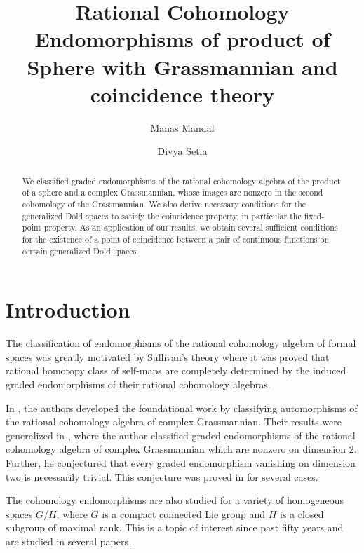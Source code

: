 \documentclass{amsart}
\title[Graded Endomorphisms of $H^*(\mathbb{S}^m \times \mathbb{C}G_{n,k};\mathbb Q)$]{%
Rational Cohomology Endomorphisms of product of Sphere with Grassmannian and coincidence theory%
}
\author[M. Mandal]{Manas Mandal}
\author[D. Setia]{Divya Setia}
\begin{document}
	\begin{abstract}
		We classified graded endomorphisms of the rational cohomology algebra of the product of a sphere and a complex Grassmannian, whose images are nonzero  in the second cohomology of the Grassmannian.
		We also derive necessary conditions for the generalized Dold spaces to satisfy the coincidence property, in particular the fixed-point property. As an application of our results, we obtain several sufficient conditions for the existence of a point of coincidence between a pair of continuous functions on certain generalized Dold spaces. 
	\end{abstract}
	
	\maketitle
	
	\section{Introduction} \label{intro}
	The classification of endomorphisms of the rational cohomology algebra of formal spaces was greatly motivated by Sullivan's theory where it was  proved that rational %
homotopy class of %
self-maps are completely determined by the induced graded endomorphisms of their rational cohomology algebras. 
	
	In \cite{brewster}, the authors developed the foundational work by classifying automorphisms of the rational cohomology algebra of complex Grassmannian. Their results were generalized in \cite{hoffman}, where the author classified graded endomorphisms of the rational cohomology algebra of complex Grassmannian which are nonzero on dimension $2$. Further, he conjectured that every graded endomorphism  vanishing on dimension two is necessarily trivial. This conjecture was proved in \cite{glover-homer} for several cases.
	
	The cohomology endomorphisms are also studied for a variety of %
homogeneous spaces $G/H$, %
where $G$ is a compact connected Lie group and $H$ is a closed
	subgroup of maximal rank. This is a topic of %
interest since past %
fifty years %
and are studied %
in several papers \cite{shiga-tezuka2, brewster-homer, hoffman-homer, Papadima, duan, duan-fang, duan-zhao, lin, goswami-sarkar}. 
	
\end{document}
